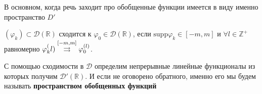 В основном, когда речь заходит про обобщенные функции имеется в виду именно пространство $D'$
\begin{to_def}
	$(\varphi_k) \subset \mathcal{D}(\mathbb{R})$ сходится к $\varphi_0 \in \mathcal{D}(\mathbb{R})$, если $\text{supp} \varphi_k \in [-m, m]$ и $\forall l \in \mathbb{Z}^+$ равномерно $\varphi_k^(l) \overset{[-m, m]}{\rightrightarrows} \varphi_0^{(l)}$.
\end{to_def}

С помощью сходимости в $\mathcal{D}$ определим непрерывные линейные функционалы из которых получим $\mathcal{D}'(\mathbb{R})$. И если не оговорено обратного, именно его мы будем называть \textbf{пространством обобщенных функций} 